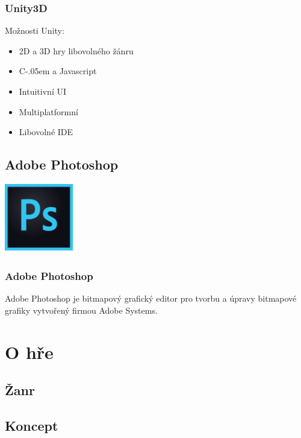 \documentclass{beamer}
\begin{document}
\begin{frame}
	\frametitle{Unity3D}
	
	Možnosti Unity: 
	\begin{itemize}
 		\item 2D a 3D hry libovolného žánru
		\item {C\kern-.05em \resizebox{!}{\dimen0}{\raisebox{\depth}{\bf \#}}} a Javascript
 		\item Intuitivní UI
 		\item Multiplatformní
 		\item Libovolné IDE
	\end{itemize}

\end{frame}
	
	\subsection{Adobe Photoshop}
	
\begin{frame}
	\begin{center}
		\includegraphics[height=3cm]{photoshop-logo.png}	
	\end{center}
	\frametitle{Adobe Photoshop}
	Adobe Photoshop je bitmapový grafický editor pro tvorbu a úpravy bitmapové grafiky vytvořený firmou Adobe Systems.
\end{frame}

\section{O hře}
	\subsection{Žanr}
	\subsection{Koncept}
		
\end{document}
